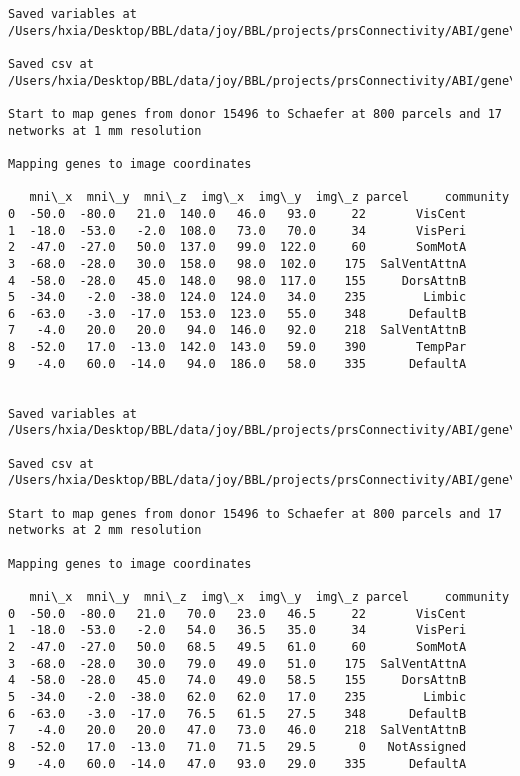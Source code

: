 \documentclass[11pt]{article}
\begin{document}
\begin{Verbatim}[commandchars=\\\{\}]
Saved variables at /Users/hxia/Desktop/BBL/data/joy/BBL/projects/prsConnectivity/ABI/gene\_mapping/15496donor\_800Parcels\_7Network\_2mm.pkl

Saved csv at /Users/hxia/Desktop/BBL/data/joy/BBL/projects/prsConnectivity/ABI/gene\_mapping/15496donor\_800Parcels\_7Network\_2mm.csv

Start to map genes from donor 15496 to Schaefer at 800 parcels and 17 networks at 1 mm resolution

Mapping genes to image coordinates

   mni\_x  mni\_y  mni\_z  img\_x  img\_y  img\_z parcel     community
0  -50.0  -80.0   21.0  140.0   46.0   93.0     22       VisCent
1  -18.0  -53.0   -2.0  108.0   73.0   70.0     34       VisPeri
2  -47.0  -27.0   50.0  137.0   99.0  122.0     60       SomMotA
3  -68.0  -28.0   30.0  158.0   98.0  102.0    175  SalVentAttnA
4  -58.0  -28.0   45.0  148.0   98.0  117.0    155     DorsAttnB
5  -34.0   -2.0  -38.0  124.0  124.0   34.0    235        Limbic
6  -63.0   -3.0  -17.0  153.0  123.0   55.0    348      DefaultB
7   -4.0   20.0   20.0   94.0  146.0   92.0    218  SalVentAttnB
8  -52.0   17.0  -13.0  142.0  143.0   59.0    390       TempPar
9   -4.0   60.0  -14.0   94.0  186.0   58.0    335      DefaultA


Saved variables at /Users/hxia/Desktop/BBL/data/joy/BBL/projects/prsConnectivity/ABI/gene\_mapping/15496donor\_800Parcels\_17Network\_1mm.pkl

Saved csv at /Users/hxia/Desktop/BBL/data/joy/BBL/projects/prsConnectivity/ABI/gene\_mapping/15496donor\_800Parcels\_17Network\_1mm.csv

Start to map genes from donor 15496 to Schaefer at 800 parcels and 17 networks at 2 mm resolution

Mapping genes to image coordinates

   mni\_x  mni\_y  mni\_z  img\_x  img\_y  img\_z parcel     community
0  -50.0  -80.0   21.0   70.0   23.0   46.5     22       VisCent
1  -18.0  -53.0   -2.0   54.0   36.5   35.0     34       VisPeri
2  -47.0  -27.0   50.0   68.5   49.5   61.0     60       SomMotA
3  -68.0  -28.0   30.0   79.0   49.0   51.0    175  SalVentAttnA
4  -58.0  -28.0   45.0   74.0   49.0   58.5    155     DorsAttnB
5  -34.0   -2.0  -38.0   62.0   62.0   17.0    235        Limbic
6  -63.0   -3.0  -17.0   76.5   61.5   27.5    348      DefaultB
7   -4.0   20.0   20.0   47.0   73.0   46.0    218  SalVentAttnB
8  -52.0   17.0  -13.0   71.0   71.5   29.5      0   NotAssigned
9   -4.0   60.0  -14.0   47.0   93.0   29.0    335      DefaultA



\end{Verbatim}
\end{document}
